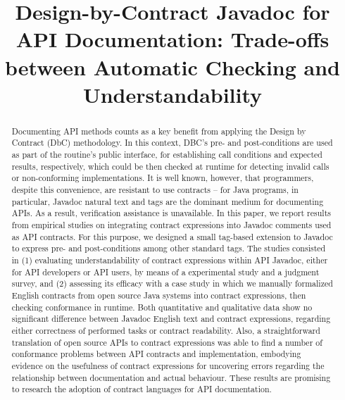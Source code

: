 \documentclass[a4paper,UKenglish]{lipics-v2018}
\title{Design-by-Contract Javadoc for API Documentation: Trade-offs between Automatic Checking and Understandability}
\author{ }{ }{ }{ }{ }
\newcommand{\contractjdoc}[1]{\textsc{ContractJDoc}}
\begin{document}
\maketitle

\begin{abstract}
Documenting API methods counts as a key benefit from applying the Design by Contract (DbC) methodology. 
In this context, DBC's pre- and post-conditions are used as part of the routine's public interface, for establishing call conditions and expected results, respectively, which could be then checked at runtime for detecting invalid calls or non-conforming implementations.
%
It is well known, however, that programmers, despite this convenience, are resistant to use contracts -- for Java programs, in particular, Javadoc natural text and tags are the dominant medium for documenting APIs. 
As a result, verification assistance is unavailable.
%
In this paper, we report results from empirical studies on integrating contract expressions into Javadoc comments used as API contracts. 
For this purpose, we designed a small tag-based extension to Javadoc to express pre- and post-conditions among other standard tags.
%
The studies consisted in (1) evaluating understandability of contract expressions within API Javadoc, either for API developers or API users, by means of a experimental study and a judgment survey, and (2) assessing its efficacy with a case study in which we manually formalized English contracts from open source Java systems into contract expressions, then checking conformance in runtime.
%
Both quantitative and qualitative data show no significant difference between Javadoc English text and contract expressions, regarding either correctness of performed tasks or contract readability. 
Also, a straightforward translation of open source APIs to contract expressions was able to find a number of conformance problems between API contracts and implementation, embodying evidence on the usefulness of contract expressions for uncovering errors regarding the relationship between documentation and actual behaviour.
%
These results are promising to research the adoption of contract languages for API documentation.
\end{abstract}













\end{document}
